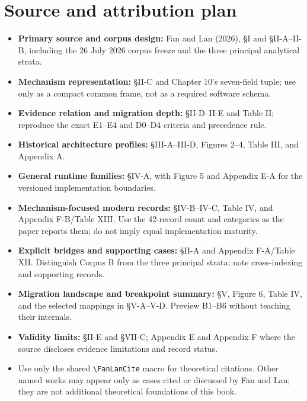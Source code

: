 \section{Source and attribution plan}
\begin{itemize}
  \item \textbf{Primary source and corpus design:} Fan and Lan (2026), \S I and \S II-A--II-B, including the 26 July 2026 corpus freeze and the three principal analytical strata.
  \item \textbf{Mechanism representation:} \S II-C and Chapter 10's seven-field tuple; use only as a compact common frame, not as a required software schema.
  \item \textbf{Evidence relation and migration depth:} \S II-D--II-E and Table II; reproduce the exact E1--E4 and D0--D4 criteria and precedence rule.
  \item \textbf{Historical architecture profiles:} \S III-A--III-D, Figures 2--4, Table III, and Appendix A.
  \item \textbf{General runtime families:} \S IV-A, with Figure 5 and Appendix E-A for the versioned implementation boundaries.
  \item \textbf{Mechanism-focused modern records:} \S IV-B--IV-C, Table IV, and Appendix F-B/Table XIII. Use the 42-record count and categories as the paper reports them; do not imply equal implementation maturity.
  \item \textbf{Explicit bridges and supporting cases:} \S II-A and Appendix F-A/Table XII. Distinguish Corpus B from the three principal strata; note cross-indexing and supporting records.
  \item \textbf{Migration landscape and breakpoint summary:} \S V, Figure 6, Table IV, and the selected mappings in \S V-A--V-D. Preview B1--B6 without teaching their internals.
  \item \textbf{Validity limits:} \S II-E and \S VII-C; Appendix E and Appendix F where the source discloses evidence limitations and record status.
  \item Use only the shared \texttt{\textbackslash FanLanCite} macro for theoretical citations. Other named works may appear only as cases cited or discussed by Fan and Lan; they are not additional theoretical foundations of this book.
\end{itemize}

